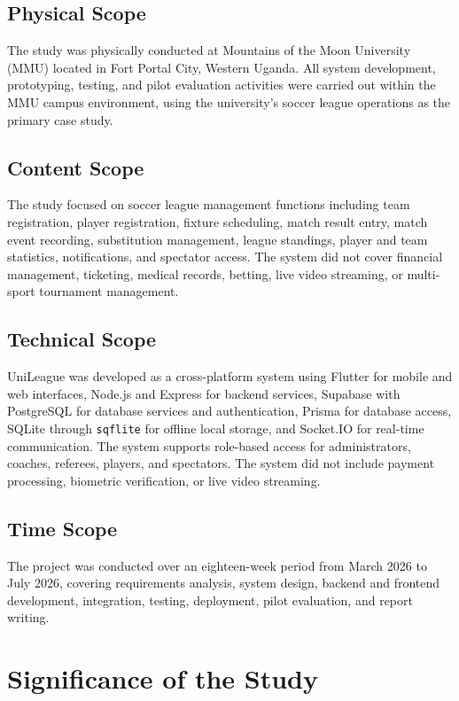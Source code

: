 \documentclass[12pt,a4paper]{report}
\begin{document}
\subsection{Physical Scope}
The study was physically conducted at Mountains of the Moon University (MMU) located in
Fort Portal City, Western Uganda. All system development, prototyping, testing, and pilot
evaluation activities were carried out within the MMU campus environment, using the
university's soccer league operations as the primary case study.

\subsection{Content Scope}
The study focused on soccer league management functions including team registration, player
registration, fixture scheduling, match result entry, match event recording, substitution
management, league standings, player and team statistics, notifications, and spectator
access. The system did not cover financial management, ticketing, medical records, betting,
live video streaming, or multi-sport tournament management.

\subsection{Technical Scope}
UniLeague was developed as a cross-platform system using Flutter for mobile and web
interfaces, Node.js and Express for backend services, Supabase with PostgreSQL for database
services and authentication, Prisma for database access, SQLite through
\texttt{sqflite} for offline local storage, and Socket.IO for real-time communication.
The system supports role-based access for administrators, coaches, referees, players,
and spectators. The system did not include payment processing, biometric verification,
or live video streaming.

\subsection{Time Scope}
The project was conducted over an eighteen-week period from March 2026 to July 2026,
covering requirements analysis, system design, backend and frontend development,
integration, testing, deployment, pilot evaluation, and report writing.

\section{Significance of the Study}
\end{document}
